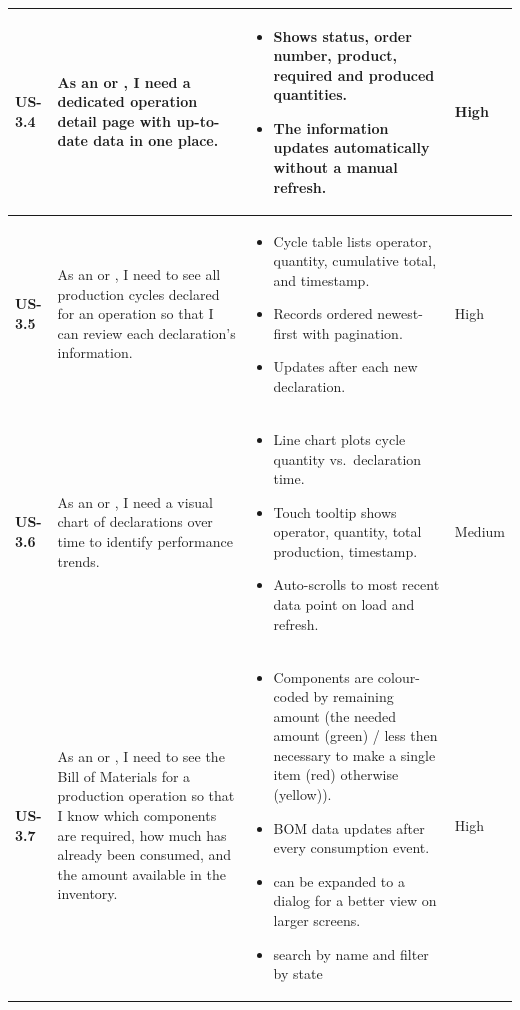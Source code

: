 \begin{longtable}{p{1.5cm} p{5cm} p{6.5cm} p{2cm}}
	\textbf{US-3.4} &
	As an \userrole{Operator} or \userrole{Supervisor}, I need a dedicated
	operation detail page with up-to-date data in one place.
	&
	\begin{itemize}[nosep, leftmargin=*]
	\item Shows status, order number, product, required and produced quantities.
	\item The information updates automatically without a manual refresh.
	\end{itemize}
	& High \\ \midrule

	\textbf{US-3.5} &
	As an \userrole{Operator} or \userrole{Supervisor}, I need to see all
	production cycles declared for an operation so that I can review each declaration's information.
	&
	\begin{itemize}[nosep, leftmargin=*]
	\item Cycle table lists operator, quantity, cumulative total, and timestamp.
	\item Records ordered newest-first with pagination.
	\item Updates after each new declaration.
	\end{itemize}
	& High \\ \midrule

	\textbf{US-3.6} &
	As an \userrole{Operator} or \userrole{Supervisor}, I need a visual chart
	of declarations over time to identify performance trends.
	&
	\begin{itemize}[nosep, leftmargin=*]
	\item Line chart plots cycle quantity vs.\ declaration time.
	\item Touch tooltip shows operator, quantity, total production, timestamp.
	\item Auto-scrolls to most recent data point on load and refresh.
	\end{itemize}
	& Medium \\ \midrule

	\textbf{US-3.7} &
	As an \userrole{Operator} or \userrole{Supervisor}, I need to see the
	Bill of Materials for a production operation so that I know which
	components are required, how much has already been consumed, and the amount 
	available in the inventory.&
	\begin{itemize}[nosep, leftmargin=*]
	\item Components are colour-coded by remaining amount (the needed amount (green) / less then necessary to make a single item (red) otherwise (yellow)).
	\item BOM data updates after every consumption event.
	\item can be expanded to a dialog for a better view on larger screens.
	\item search by name and filter by state
	\end{itemize}
	& High \\ \midrule


\end{longtable}
